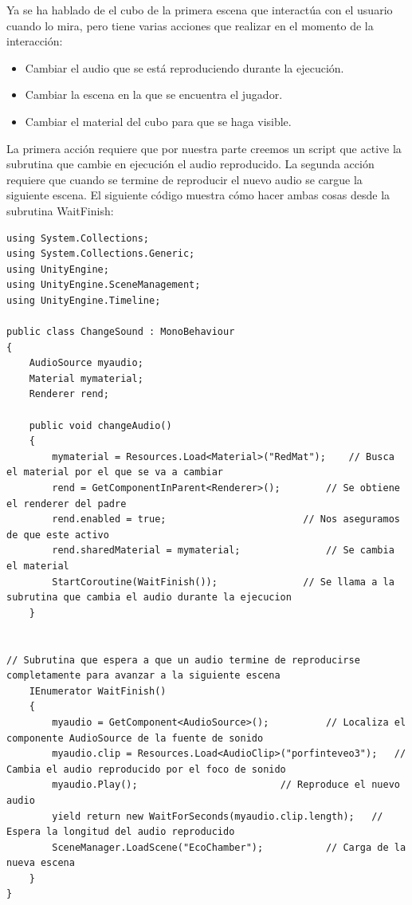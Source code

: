 \quad Ya se ha hablado de el cubo de la primera escena que interactúa con el usuario cuando lo mira, pero tiene varias acciones que realizar en el momento de la interacción:

\begin{itemize}
	\item Cambiar el audio que se está reproduciendo durante la ejecución.
	\item Cambiar la escena en la que se encuentra el jugador.
	\item Cambiar el material del cubo para que se haga visible.
\end{itemize}

\quad La primera acción requiere que por nuestra parte creemos un script que active la subrutina que cambie en ejecución el audio reproducido. La segunda acción requiere que cuando se termine de reproducir el nuevo audio se cargue la siguiente escena. El siguiente código muestra cómo hacer ambas cosas desde la subrutina WaitFinish:\\

\lstset{language=[sharp]C, breaklines=true, basicstyle=\footnotesize}
\begin{lstlisting}[frame=single, caption={ChangeSound.cs}]
using System.Collections;
using System.Collections.Generic;
using UnityEngine;
using UnityEngine.SceneManagement;
using UnityEngine.Timeline;

public class ChangeSound : MonoBehaviour
{
    AudioSource myaudio;
    Material mymaterial;
    Renderer rend;

    public void changeAudio()
    {
        mymaterial = Resources.Load<Material>("RedMat");	// Busca el material por el que se va a cambiar
        rend = GetComponentInParent<Renderer>();		// Se obtiene el renderer del padre
        rend.enabled = true;						// Nos aseguramos de que este activo
        rend.sharedMaterial = mymaterial;				// Se cambia el material
        StartCoroutine(WaitFinish());				// Se llama a la subrutina que cambia el audio durante la ejecucion
    }


// Subrutina que espera a que un audio termine de reproducirse completamente para avanzar a la siguiente escena 
    IEnumerator WaitFinish()
    {
        myaudio = GetComponent<AudioSource>();			// Localiza el componente AudioSource de la fuente de sonido
        myaudio.clip = Resources.Load<AudioClip>("porfinteveo3");	// Cambia el audio reproducido por el foco de sonido
        myaudio.Play();							// Reproduce el nuevo audio
        yield return new WaitForSeconds(myaudio.clip.length);	// Espera la longitud del audio reproducido
        SceneManager.LoadScene("EcoChamber");			// Carga de la nueva escena
    }
}

\end{lstlisting}

